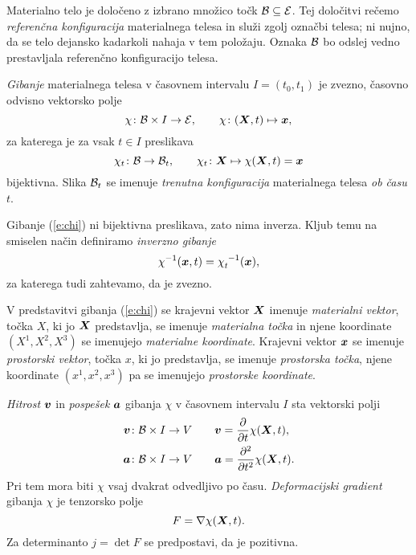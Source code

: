 Materialno telo je določeno z izbrano množico točk $\mathcal B\subseteq\mathcal E$. Tej določitvi rečemo
\emph{referenčna konfiguracija} materialnega telesa in služi zgolj označbi telesa; ni nujno,
da se telo dejansko kadarkoli nahaja v tem položaju. Oznaka $\mathcal B$ bo odslej vedno prestavljala
referenčno konfiguracijo telesa.

\begin{definicija}
	\emph{Gibanje} materialnega telesa v časovnem
	intervalu $I=(t_0,t_1)$ je zvezno, časovno odvisno vektorsko polje
	\begin{equation}\label{e:chi}
		\chi\colon\mathcal B\times I\to\mathcal E,\qquad \chi\colon (\boldsymbol X,t)\mapsto\boldsymbol x,
	\end{equation}
	za katerega je za vsak $t\in I$ preslikava
	\[ \chi_t\colon\mathcal B\to\mathcal B_t, \qquad \chi_t\colon\boldsymbol X\mapsto\chi(\boldsymbol X,t)=\boldsymbol x \]
	bijektivna. Slika $\mathcal B_t$ se imenuje \emph{trenutna konfiguracija} materialnega
	telesa \emph{ob času} $t$.
\end{definicija}
Gibanje (\ref{e:chi}) ni bijektivna preslikava, zato nima inverza. Kljub temu na smiselen
način definiramo \emph{inverzno gibanje}
\[ \chi^{-1}(\vek{x},t)=\bottop{\chi}{t}{-1}(\vek{x}), \]
za katerega tudi zahtevamo, da je zvezno.

V predstavitvi gibanja (\ref{e:chi}) se krajevni vektor $\boldsymbol X$ imenuje \emph{materialni vektor},
točka $X$, ki jo $\boldsymbol X$ predstavlja, se imenuje \emph{materialna točka} in njene koordinate
$(X^1,X^2,X^3)$ se imenujejo \emph{materialne koordinate}. Krajevni vektor $\boldsymbol x$ se imenuje
\emph{prostorski vektor}, točka $x$, ki jo predstavlja, se imenuje \emph{prostorska točka},
njene koordinate $(x^1,x^2,x^3)$ pa se imenujejo \emph{prostorske koordinate}.

\emph{Hitrost} $\boldsymbol v$ in \emph{pospešek} $\boldsymbol a$ gibanja $\chi$ v časovnem intervalu $I$ sta vektorski polji
\begin{align}
	\boldsymbol v\colon\mathcal B\times I\to V \qquad & \boldsymbol v = \frac{\partial}{\partial t}\chi(\boldsymbol X,t), \label{e:v} \\
	\boldsymbol a\colon\mathcal B\times I\to V \qquad & \boldsymbol a = \frac{\partial^2}{\partial t^2}\chi(\boldsymbol X,t). \label{e:a}
\end{align}
Pri tem mora biti $\chi$ vsaj dvakrat odvedljivo po času. \emph{Deformacijski gradient} gibanja $\chi$ je
tenzorsko polje
\[ F=\nabla\chi(\boldsymbol X,t). \]
Za determinanto $j=\det F$ se predpostavi, da je pozitivna.


